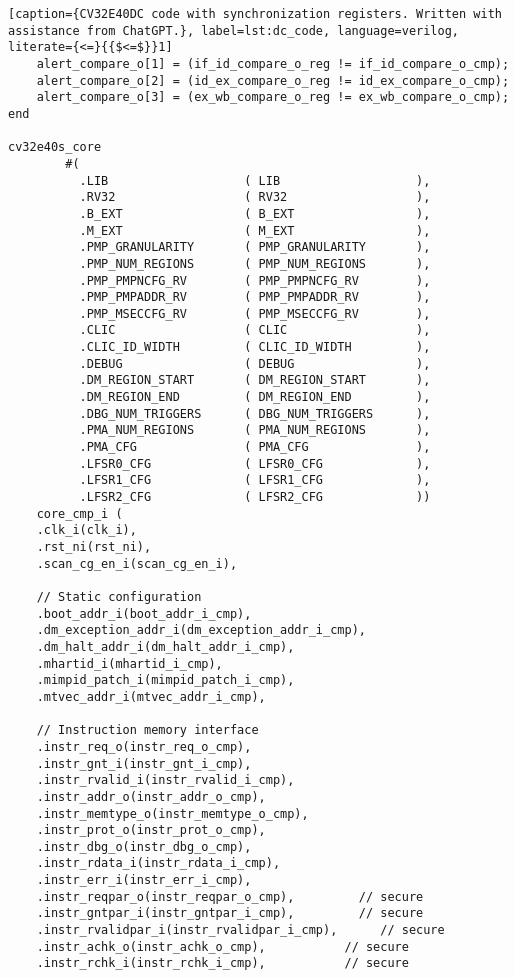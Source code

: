 \begin{lstlisting}[caption={CV32E40DC code with synchronization registers. Written with assistance from ChatGPT.}, label=lst:dc_code, language=verilog, literate={<=}{{$<=$}}1]
    alert_compare_o[1] = (if_id_compare_o_reg != if_id_compare_o_cmp);
    alert_compare_o[2] = (id_ex_compare_o_reg != id_ex_compare_o_cmp);
    alert_compare_o[3] = (ex_wb_compare_o_reg != ex_wb_compare_o_cmp);
end

cv32e40s_core
        #(
          .LIB                   ( LIB                   ),
          .RV32                  ( RV32                  ),
          .B_EXT                 ( B_EXT                 ),
          .M_EXT                 ( M_EXT                 ),
          .PMP_GRANULARITY       ( PMP_GRANULARITY       ),
          .PMP_NUM_REGIONS       ( PMP_NUM_REGIONS       ),
          .PMP_PMPNCFG_RV        ( PMP_PMPNCFG_RV        ),
          .PMP_PMPADDR_RV        ( PMP_PMPADDR_RV        ),
          .PMP_MSECCFG_RV        ( PMP_MSECCFG_RV        ),
          .CLIC                  ( CLIC                  ),
          .CLIC_ID_WIDTH         ( CLIC_ID_WIDTH         ),
          .DEBUG                 ( DEBUG                 ),
          .DM_REGION_START       ( DM_REGION_START       ),
          .DM_REGION_END         ( DM_REGION_END         ),
          .DBG_NUM_TRIGGERS      ( DBG_NUM_TRIGGERS      ),
          .PMA_NUM_REGIONS       ( PMA_NUM_REGIONS       ),
          .PMA_CFG               ( PMA_CFG               ),
          .LFSR0_CFG             ( LFSR0_CFG             ),
          .LFSR1_CFG             ( LFSR1_CFG             ),
          .LFSR2_CFG             ( LFSR2_CFG             ))
    core_cmp_i (
    .clk_i(clk_i),
    .rst_ni(rst_ni),
    .scan_cg_en_i(scan_cg_en_i),

    // Static configuration
    .boot_addr_i(boot_addr_i_cmp),
    .dm_exception_addr_i(dm_exception_addr_i_cmp),
    .dm_halt_addr_i(dm_halt_addr_i_cmp),
    .mhartid_i(mhartid_i_cmp),
    .mimpid_patch_i(mimpid_patch_i_cmp),
    .mtvec_addr_i(mtvec_addr_i_cmp),

    // Instruction memory interface
    .instr_req_o(instr_req_o_cmp),
    .instr_gnt_i(instr_gnt_i_cmp),
    .instr_rvalid_i(instr_rvalid_i_cmp),
    .instr_addr_o(instr_addr_o_cmp),
    .instr_memtype_o(instr_memtype_o_cmp),
    .instr_prot_o(instr_prot_o_cmp),
    .instr_dbg_o(instr_dbg_o_cmp),
    .instr_rdata_i(instr_rdata_i_cmp),
    .instr_err_i(instr_err_i_cmp),
    .instr_reqpar_o(instr_reqpar_o_cmp),         // secure
    .instr_gntpar_i(instr_gntpar_i_cmp),         // secure
    .instr_rvalidpar_i(instr_rvalidpar_i_cmp),      // secure
    .instr_achk_o(instr_achk_o_cmp),           // secure
    .instr_rchk_i(instr_rchk_i_cmp),           // secure


\end{lstlisting}
